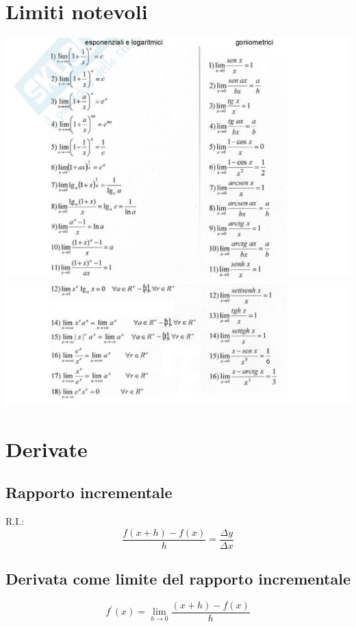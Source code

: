\documentclass{report}
\begin{document}
\section{Limiti notevoli}
    \begin{center}
        \hspace*{-1.85in}
        \includegraphics[width=2\textwidth]{limiti-notevoli1.jpg}
        \hspace*{-1.85in}
        \includegraphics[width=2\textwidth]{limiti-notevoli2.jpg}
    \end{center}
\newpage
\section{Derivate}
    \subsection{Rapporto incrementale}
        R.I.:
        $$\frac{f\left(x+h\right) - f\left(x\right)}{h} = \frac{\Delta y}{\Delta x}$$
    \subsection{Derivata come limite del rapporto incrementale}
        $$f^{'}\left(x\right) = \lim_{h \to 0} \frac{\left(x+h\right) - f\left(x\right)}{h}$$
\end{document}
